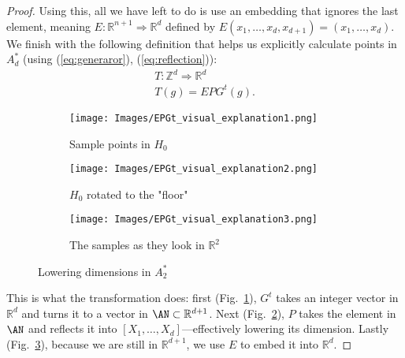 \begin{proof}
    
    Using this, all we have left to do is use an embedding that ignores the last element, meaning $E:\mathbb{R}^{n+1}\Rightarrow\mathbb{R}^d$ defined by $E\left(x_1,\dots,x_d,x_{d+1}\right)=\left(x_1,\dots,x_d\right)$. We finish with the following definition that helps us explicitly calculate points in $A_d^*$ (using (\ref{eq:generaror}), (\ref{eq:reflection})):
    \begin{align}
        T: \mathbb{Z}^d\Rightarrow\mathbb{R}^d \nonumber \\
        T\left(g\right) = EPG^t\left(g\right).
    \end{align}
    \begin{figure}[H]
        \centering
        \begin{subfigure}[b]{0.49\textwidth}
            \texttt{[image: Images/EPGt\_visual\_explanation1.png]}
            \caption{Sample points in $H_0$}
            \label{fig:epgt_visual1}
        \end{subfigure}
        \hfill
        \begin{subfigure}[b]{0.49\textwidth}
            \texttt{[image: Images/EPGt\_visual\_explanation2.png]}
            \caption{$H_0$ rotated to the "floor"}
            \label{fig:epgt_visual2}
        \end{subfigure}
        \hfill
        \begin{subfigure}[b]{0.49\textwidth}
            \texttt{[image: Images/EPGt\_visual\_explanation3.png]}
            \caption{The samples as they look in $\mathbb{R}^2$}
            \label{fig:epgt_visual3}
        \end{subfigure}
        \caption{Lowering dimensions in $A_2^*$}
        \label{fig:egpt_visual}
    \end{figure}
    This is what the transformation does: first (Fig.~\ref{fig:epgt_visual1}), $G^t$ takes an integer vector in $\mathbb{R}^d$ and turns it to a vector in $\AN\subset\mathbb{R}^{d+1}$. Next (Fig.~\ref{fig:epgt_visual2}), $P$ takes the element in $\AN$ and reflects it into $[X_1,\dots,X_d]$---effectively lowering its dimension. Lastly (Fig.~\ref{fig:epgt_visual3}), because we are still in $\mathbb{R}^{d+1}$, we use $E$ to embed it into $\mathbb{R}^d$.
    

\end{proof}
